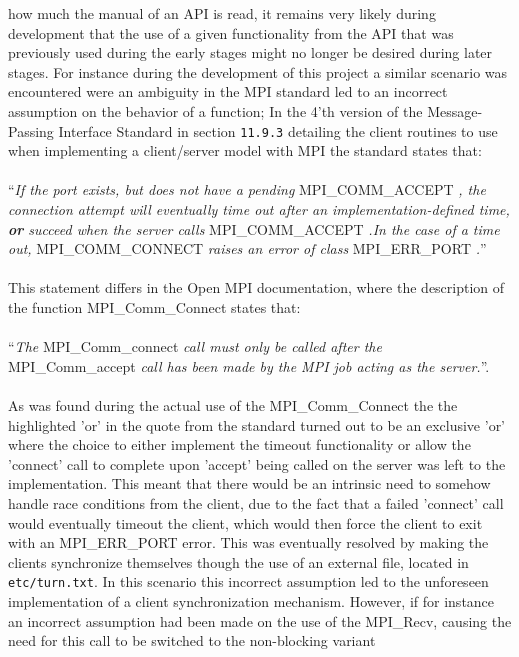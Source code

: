\documentclass[11pt]{article}
\begin{document}
how much the manual of an API is read, it remains very likely during development
that the use of a given functionality from the API that was previously used
during the early stages might no longer be desired during later stages. For
instance during the development of this project a similar scenario was
encountered were an ambiguity in the MPI standard led to an incorrect assumption
on the behavior of a function; In the 4'th version of the Message-Passing
Interface Standard in section \texttt{11.9.3} detailing the client routines to
use when implementing a client/server model with MPI the standard states
that:\\\\ ``\textit{If the port exists, but does not have a pending}
MPI\_COMM\_ACCEPT \textit{, the connection attempt will eventually time out
  after an implementation-defined time, \textbf{or} succeed when the server
  calls} MPI\_COMM\_ACCEPT \textit{.In the case of a time out,}
MPI\_COMM\_CONNECT \textit{raises an error of class } MPI\_ERR\_PORT
\textit{.}''\\\\ This statement differs in the Open MPI documentation, where the
description of the function MPI\_Comm\_Connect states that:\\\\ ``\textit{The}
MPI\_Comm\_connect \textit{call must only be called after the} MPI\_Comm\_accept
\textit{call has been made by the MPI job acting as the server.}''.\\\\ As was
found during the actual use of the MPI\_Comm\_Connect the the highlighted 'or' in
the quote from the standard turned out to be an exclusive 'or' where the choice
to either implement the timeout functionality or allow the 'connect' call to
complete upon 'accept' being called on the server was left to the
implementation. This meant that there would be an intrinsic need to somehow
handle race conditions from the client, due to the fact that a failed 'connect'
call would eventually timeout the client, which would then force the client to
exit with an MPI\_ERR\_PORT error. This was eventually resolved by making the
clients synchronize themselves though the use of an external file, located in
\texttt{etc/turn.txt}. In this scenario this incorrect assumption led to the
unforeseen implementation of a client synchronization mechanism. However, if for
instance an incorrect assumption had been made on the use of the MPI\_Recv,
causing the need for this call to be switched to the non-blocking variant
\end{document}

